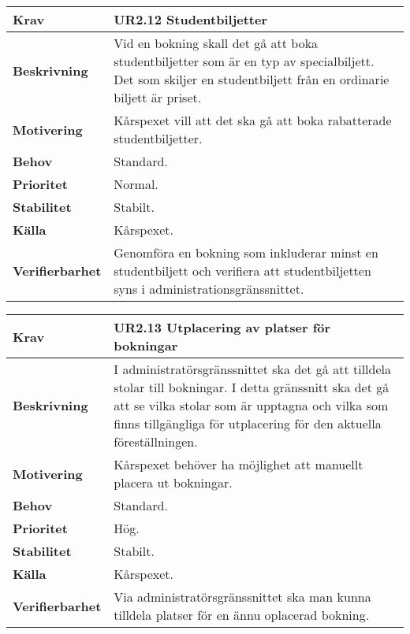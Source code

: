 \documentclass[a4paper, twoside, 11pt, titlepage]{article}
\begin{document}
		\begin {table} [ht] \begin{tabular} { p{2.6cm} p{12.5cm} }
			\hline
			{\sffamily\textbf{Krav}} & {\sffamily\textbf{UR2.12 Studentbiljetter }} \\
			\hline
			{\sffamily\textbf{Beskrivning}} & {Vid en bokning skall det gå att boka studentbiljetter som är en typ av specialbiljett. Det som skiljer en studentbiljett från en ordinarie biljett är priset.} \\
			\hline
			{\sffamily\textbf{Motivering}} & {Kårspexet vill att det ska gå att boka rabatterade studentbiljetter.} \\
			\hline
			{\sffamily\textbf{Behov}} & {Standard.} \\
			\hline
			{\sffamily\textbf{Prioritet}} & {Normal.} \\
			\hline
			{\sffamily\textbf{Stabilitet}} & {Stabilt.} \\
			\hline
			{\sffamily\textbf{Källa}} & {Kårspexet.} \\
			\hline
			{\sffamily\textbf{Verifierbarhet}} & {Genomföra en bokning som inkluderar minst en studentbiljett och verifiera att studentbiljetten syns i administrationsgränssnittet.} \\
			\hline
		\end{tabular} \end{table} \FloatBarrier
		\vspace{6mm}

		\begin {table} [ht] \begin{tabular} { p{2.6cm} p{12.5cm} }
			\hline
			{\sffamily\textbf{Krav}} & {\sffamily\textbf{UR2.13 Utplacering av platser för bokningar }} \\
			\hline
			{\sffamily\textbf{Beskrivning}} & {I administratörsgränssnittet ska det gå att tilldela stolar till bokningar. I detta gränssnitt ska det gå att se vilka stolar som är upptagna och vilka som finns tillgängliga för utplacering för den aktuella föreställningen.} \\
			\hline
			{\sffamily\textbf{Motivering}} & {Kårspexet behöver ha möjlighet att manuellt placera ut bokningar.} \\
			\hline
			{\sffamily\textbf{Behov}} & {Standard.} \\
			\hline
			{\sffamily\textbf{Prioritet}} & {Hög.} \\
			\hline
			{\sffamily\textbf{Stabilitet}} & {Stabilt.} \\
			\hline
			{\sffamily\textbf{Källa}} & {Kårspexet.} \\
			\hline
			{\sffamily\textbf{Verifierbarhet}} & {Via administratörsgränssnittet ska man kunna tilldela platser för en ännu oplacerad bokning.} \\
			\hline
		\end{tabular} \end{table} \FloatBarrier
		\vspace{6mm}
\end{document}
